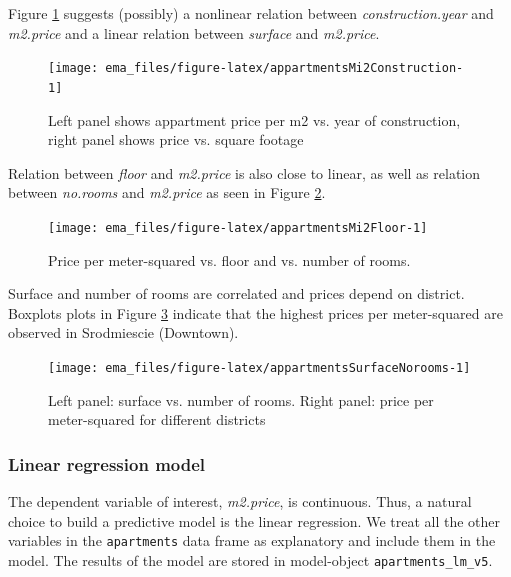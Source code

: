\documentclass[12pt,]{krantz}
\begin{document}
Figure \ref{fig:appartmentsMi2Construction} suggests (possibly) a nonlinear relation between \emph{construction.year} and \emph{m2.price} and a linear relation between \emph{surface} and \emph{m2.price}.

\begin{figure}

{\centering \texttt{[image: ema\_files/figure-latex/appartmentsMi2Construction-1]} 

}

\caption{Left panel shows appartment price per m2 vs. year of construction, right panel shows price  vs. square footage}\label{fig:appartmentsMi2Construction}
\end{figure}

Relation between \emph{floor} and \emph{m2.price} is also close to linear, as well as relation between \emph{no.rooms} and \emph{m2.price} as seen in Figure \ref{fig:appartmentsMi2Floor}.

\begin{figure}

{\centering \texttt{[image: ema\_files/figure-latex/appartmentsMi2Floor-1]} 

}

\caption{Price per meter-squared vs. floor and vs. number of rooms.}\label{fig:appartmentsMi2Floor}
\end{figure}

Surface and number of rooms are correlated and prices depend on district. Boxplots plots in Figure \ref{fig:appartmentsSurfaceNorooms} indicate that the highest prices per meter-squared are observed in Srodmiescie (Downtown).

\begin{figure}

{\centering \texttt{[image: ema\_files/figure-latex/appartmentsSurfaceNorooms-1]} 

}

\caption{Left panel: surface vs. number of rooms. Right panel: price per meter-squared for different districts}\label{fig:appartmentsSurfaceNorooms}
\end{figure}

\hypertarget{model-Apartments-lr}{%
\subsubsection{Linear regression model}\label{model-Apartments-lr}}

The dependent variable of interest, \emph{m2.price}, is continuous. Thus, a natural choice to build a predictive model is the linear regression. We treat all the other variables in the \texttt{apartments} data frame as explanatory and include them in the model. The results of the model are stored in model-object \texttt{apartments\_lm\_v5}.
\end{document}
